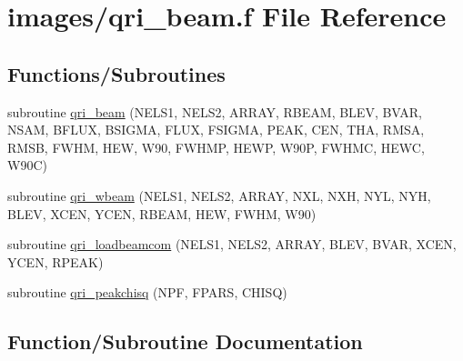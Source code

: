 \hypertarget{qri__beam_8f}{}\section{images/qri\+\_\+beam.f File Reference}
\label{qri__beam_8f}
\subsection*{Functions/\+Subroutines}
\begin{DoxyCompactItemize}
\item 
subroutine \hyperlink{qri__beam_8f_ad3667f79dfd65387c97a53cc5e55c1af}{qri\+\_\+beam} (N\+E\+L\+S1, N\+E\+L\+S2, A\+R\+R\+AY, R\+B\+E\+AM, B\+L\+EV, B\+V\+AR, N\+S\+AM, B\+F\+L\+UX, B\+S\+I\+G\+MA, F\+L\+UX, F\+S\+I\+G\+MA, P\+E\+AK, C\+EN, T\+HA, R\+M\+SA, R\+M\+SB, F\+W\+HM, H\+EW, W90, F\+W\+H\+MP, H\+E\+WP, W90P, F\+W\+H\+MC, H\+E\+WC, W90C)
\item 
subroutine \hyperlink{qri__beam_8f_ae78196eb48587353d5378c6bd9b2fc06}{qri\+\_\+wbeam} (N\+E\+L\+S1, N\+E\+L\+S2, A\+R\+R\+AY, N\+XL, N\+XH, N\+YL, N\+YH, B\+L\+EV, X\+C\+EN, Y\+C\+EN, R\+B\+E\+AM, H\+EW, F\+W\+HM, W90)
\item 
subroutine \hyperlink{qri__beam_8f_a130df173495bc9b58bd77fcdb6393924}{qri\+\_\+loadbeamcom} (N\+E\+L\+S1, N\+E\+L\+S2, A\+R\+R\+AY, B\+L\+EV, B\+V\+AR, X\+C\+EN, Y\+C\+EN, R\+P\+E\+AK)
\item 
subroutine \hyperlink{qri__beam_8f_aa2a6569c86400d6eb961ced9a86562fd}{qri\+\_\+peakchisq} (N\+PF, F\+P\+A\+RS, C\+H\+I\+SQ)
\end{DoxyCompactItemize}


\subsection{Function/\+Subroutine Documentation}
\mbox{\label{qri__beam_8f_ad3667f79dfd65387c97a53cc5e55c1af}} 
